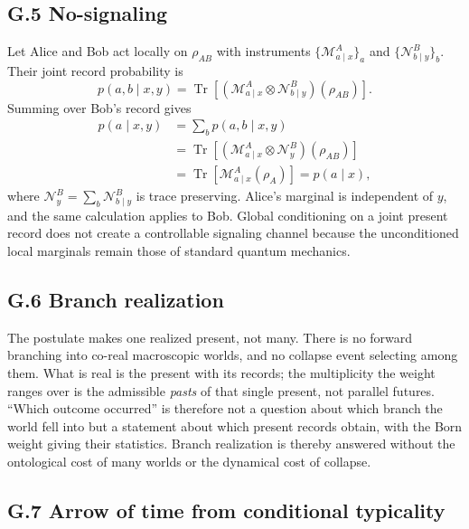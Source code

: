 \documentclass[11pt]{article}
\begin{document}
\subsection*{G.5 No-signaling}

Let Alice and Bob act locally on $\rho_{AB}$ with instruments $\{\mathcal M^A_{a\mid x}\}_a$ and $\{\mathcal N^B_{b\mid y}\}_b$. Their joint record probability is
\[
p(a,b\mid x,y)=\operatorname{Tr}\!\left[
(\mathcal M^A_{a\mid x}\otimes\mathcal N^B_{b\mid y})(\rho_{AB})
\right].
\]
Summing over Bob's record gives
\begin{align}
p(a\mid x,y)
&=\sum_b p(a,b\mid x,y)\\
&=\operatorname{Tr}\!\left[
(\mathcal M^A_{a\mid x}\otimes\mathcal N^B_y)(\rho_{AB})
\right]\\
&=\operatorname{Tr}\!\left[\mathcal M^A_{a\mid x}(\rho_A)\right]
=p(a\mid x),
\end{align}
where $\mathcal N^B_y=\sum_b\mathcal N^B_{b\mid y}$ is trace preserving. Alice's marginal is independent of $y$, and the same calculation applies to Bob. Global conditioning on a joint present record does not create a controllable signaling channel because the unconditioned local marginals remain those of standard quantum mechanics.

\subsection*{G.6 Branch realization}

The postulate makes one realized present, not many. There is no forward branching into co-real macroscopic worlds, and no collapse event selecting among them. What is real is the present with its records; the multiplicity the weight ranges over is the admissible \emph{pasts} of that single present, not parallel futures. ``Which outcome occurred'' is therefore not a question about which branch the world fell into but a statement about which present records obtain, with the Born weight giving their statistics. Branch realization is thereby answered without the ontological cost of many worlds or the dynamical cost of collapse.

\subsection*{G.7 Arrow of time from conditional typicality}
\end{document}
